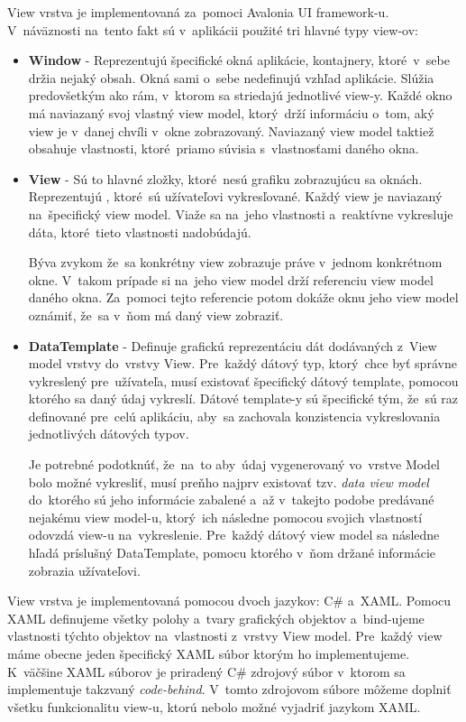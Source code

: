 View vrstva je implementovaná za~pomoci Avalonia UI framework-u. V~náväznosti na~tento fakt sú v~aplikácii použité tri hlavné typy view-ov:
\begin{itemize}
    \item \textbf{Window} - Reprezentujú špecifické okná aplikácie,  kontajnery, ktoré~v~sebe držia nejaký obsah. Okná sami o~sebe nedefinujú vzhľad aplikácie. Slúžia predovšetkým ako rám, v~ktorom sa striedajú jednotlivé view-y. Každé okno má naviazaný svoj vlastný view model, ktorý~drží informáciu o~tom, aký view je v~danej chvíli v~okne zobrazovaný. Naviazaný view model taktiež obsahuje vlastnosti, ktoré~priamo súvisia s~vlastnosťami daného okna.
    \item \textbf{View} - Sú to hlavné zložky, ktoré~nesú grafiku zobrazujúcu sa oknách. Reprezentujú , ktoré~sú užívateľovi vykresľované. Každý view je naviazaný na~špecifický view model. Viaže sa na~jeho vlastnosti a~reaktívne vykresluje dáta, ktoré~tieto vlastnosti nadobúdajú. 
    
    Býva zvykom že~sa konkrétny view zobrazuje práve v~jednom konkrétnom okne. V~takom prípade si na~jeho view model drží referenciu view model daného okna. Za~pomoci tejto referencie potom dokáže oknu jeho view model oznámiť, že~sa v~ňom má daný view zobraziť. 
    \item \textbf{DataTemplate} - Definuje grafickú reprezentáciu dát dodávaných z~View model vrstvy do~vrstvy View. Pre~každý dátový typ, ktorý~chce byť správne vykreslený pre~užívateľa, musí existovať špecifický dátový template, pomocou ktorého sa daný údaj vykreslí. Dátové template-y sú špecifické tým, že~sú raz definované pre~celú aplikáciu, aby~sa zachovala konzistencia vykreslovania jednotlivých dátových typov.

    Je potrebné podotknúť, že~na~to aby~údaj vygenerovaný vo~vrstve Model bolo možné vykresliť, musí preňho najprv existovať tzv. \textit{data view model} do~ktorého sú jeho informácie zabalené a~až v~takejto podobe predávané nejakému view model-u, ktorý~ich následne pomocou svojich vlastností odovzdá view-u na~vykreslenie. Pre~každý dátový view model sa následne hľadá príslušný DataTemplate, pomocu ktorého v~ňom držané informácie zobrazia užívateľovi. 
\end{itemize}   

View vrstva je implementovaná pomocou dvoch jazykov: C\# a~XAML. Pomocu XAML definujeme všetky polohy a~tvary grafických objektov a~bind-ujeme vlastnosti týchto objektov na~vlastnosti z~vrstvy View model. Pre~každý view máme obecne jeden špecifický XAML súbor ktorým ho implementujeme. K~väčšine XAML súborov je priradený C\# zdrojový súbor v~ktorom sa implementuje takzvaný \textit{code-behind}. V~tomto zdrojovom súbore môžeme doplniť všetku funkcionalitu view-u, ktorú nebolo možné vyjadriť jazykom XAML.    

